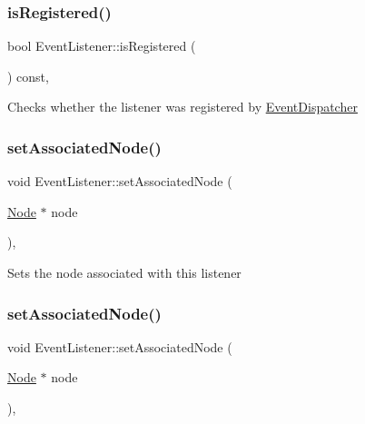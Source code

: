 \subsubsection{\texorpdfstring{is\+Registered()}{isRegistered()}\hspace{0.1cm}{\footnotesize\ttfamily [2/2]}}
{\footnotesize\ttfamily bool Event\+Listener\+::is\+Registered (\begin{DoxyParamCaption}{ }\end{DoxyParamCaption}) const\hspace{0.3cm}{\ttfamily [inline]}, {\ttfamily [protected]}}

Checks whether the listener was registered by \hyperlink{classEventDispatcher}{Event\+Dispatcher} \mbox{\label{classEventListener_a6d1e92c8e26170ac8ec877446f619120}} 
\subsubsection{\texorpdfstring{set\+Associated\+Node()}{setAssociatedNode()}\hspace{0.1cm}{\footnotesize\ttfamily [1/2]}}
{\footnotesize\ttfamily void Event\+Listener\+::set\+Associated\+Node (\begin{DoxyParamCaption}\item[{\hyperlink{classNode}{Node} $\ast$}]{node }\end{DoxyParamCaption})\hspace{0.3cm}{\ttfamily [inline]}, {\ttfamily [protected]}}

Sets the node associated with this listener \mbox{\label{classEventListener_a6d1e92c8e26170ac8ec877446f619120}} 
\subsubsection{\texorpdfstring{set\+Associated\+Node()}{setAssociatedNode()}\hspace{0.1cm}{\footnotesize\ttfamily [2/2]}}
{\footnotesize\ttfamily void Event\+Listener\+::set\+Associated\+Node (\begin{DoxyParamCaption}\item[{\hyperlink{classNode}{Node} $\ast$}]{node }\end{DoxyParamCaption})\hspace{0.3cm}{\ttfamily [inline]}, {\ttfamily [protected]}}

